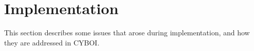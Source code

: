 %
%
%
%
%
%
%

\section{Implementation}
\label{implementation_heading}

This section describes some issues that arose during implementation, and how
they are addressed in CYBOI.







